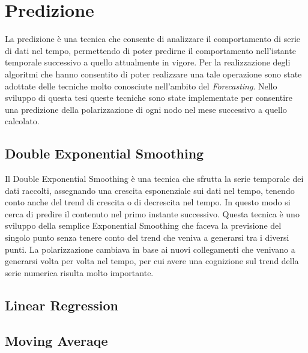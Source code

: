 \section{Predizione}
La predizione è una tecnica che consente di analizzare il comportamento di serie di dati nel tempo, permettendo di poter predirne il comportamento nell'istante temporale successivo a quello attualmente in vigore.
Per la realizzazione degli algoritmi che hanno consentito di poter realizzare una tale operazione sono state adottate delle tecniche molto conosciute nell'ambito del \textit{Forecasting}.
Nello sviluppo di questa tesi queste tecniche sono state implementate per consentire una predizione della polarizzazione di ogni nodo nel mese successivo a quello calcolato.
\subsection{Double Exponential Smoothing}
Il Double Exponential Smoothing è una tecnica che sfrutta la serie temporale dei dati raccolti, assegnando una crescita esponenziale sui dati nel tempo, tenendo conto anche del trend di crescita o di decrescita nel tempo. In questo modo si cerca di predire il contenuto nel primo instante successivo.
Questa tecnica è uno sviluppo della semplice Exponential Smoothing che faceva la previsione del singolo punto senza tenere conto del trend che veniva a generarsi tra i diversi punti. 
La polarizzazione cambiava in base ai nuovi collegamenti che venivano a generarsi volta per volta nel tempo, per cui avere una cognizione sul trend della serie numerica risulta molto importante.
\subsection{Linear Regression}
\subsection{Moving Averaqe}
